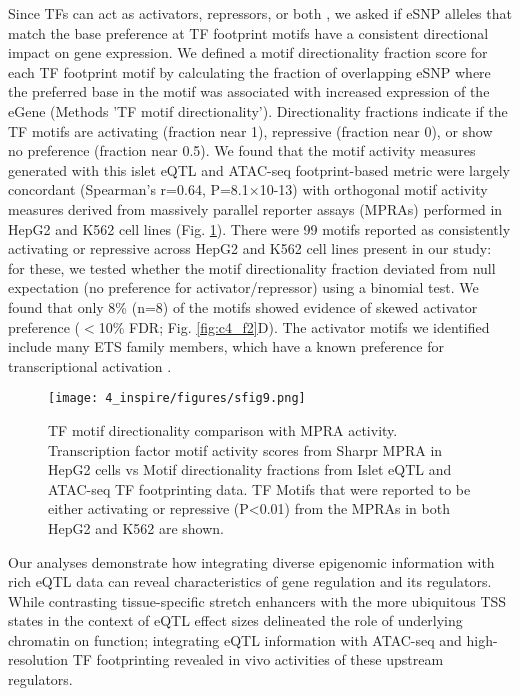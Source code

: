 Since TFs can act as activators, repressors, or both \cite{ernstGenomescaleHighresolutionMapping2016}, we asked if eSNP alleles that match the base preference at TF footprint motifs have a consistent directional impact on gene expression. We defined a motif directionality fraction score for each TF footprint motif by calculating the fraction of overlapping eSNP where the preferred base in the motif was associated with increased expression of the eGene (Methods 'TF motif directionality'). Directionality fractions indicate if the TF motifs are activating (fraction near 1), repressive (fraction near 0), or show no preference (fraction near 0.5). We found that the motif activity measures generated with this islet eQTL and ATAC-seq footprint-based metric were largely concordant (Spearman's r=0.64, P=8.1×10-13) with orthogonal motif activity measures derived from massively parallel reporter assays (MPRAs) performed in HepG2 and K562 cell lines \cite{ernstGenomescaleHighresolutionMapping2016} (Fig. \ref{fig:c4_sf_mpra}). There were 99 motifs reported as consistently activating or repressive across HepG2 and K562 cell lines present in our study: for these, we tested whether the motif directionality fraction deviated from null expectation (no preference for activator/repressor) using a binomial test. We found that only 8\% (n=8) of the motifs showed evidence of skewed activator preference ($<$10\% FDR; Fig. \ref{fig:c4_f2}D). The activator motifs we identified include many ETS family members, which have a known preference for transcriptional activation \cite{ernstGenomescaleHighresolutionMapping2016}. 

\begin{figure}
    \centering
    \texttt{[image: 4\_inspire/figures/sfig9.png]}
    \caption[TF motif directionality comparison with MPRA activity]{TF motif directionality comparison with MPRA activity. Transcription factor motif activity scores from Sharpr MPRA in HepG2 cells \cite{ernstGenomescaleHighresolutionMapping2016} vs Motif directionality fractions from Islet eQTL and ATAC-seq TF footprinting data. TF Motifs that were reported to be either activating or repressive (P<0.01) from the MPRAs in both HepG2 and K562 are shown.}
    \label{fig:c4_sf_mpra}
\end{figure}


Our analyses demonstrate how integrating diverse epigenomic information with rich eQTL data can reveal characteristics of gene regulation and its regulators. While contrasting tissue-specific stretch enhancers with the more ubiquitous TSS states in the context of eQTL effect sizes delineated the role of underlying chromatin on function; integrating eQTL information with ATAC-seq and high-resolution TF footprinting revealed in vivo activities of these upstream regulators.  

